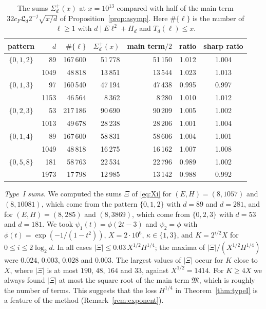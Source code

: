 \documentclass[11pt]{amsart}
\theoremstyle{remark}
\theoremstyle{definition}
\numberwithin{equation}{section}
\newcommand{\Lf}{\mathfrak{L}}
\begin{document}
\begin{table}[h]
\centering
\setlength{\tabcolsep}{6pt}
\begin{tabular}{crrrrcc}
\toprule
pattern & $d$ & $\#\{\ell\}$ & $\Sigma^+_d(x)$ & main term$/2$ & ratio & sharp ratio\\
\midrule
$\{0,1,2\}$ & 89 & 167\,600 & 51\,778 & 51\,150 & 1.012 & 1.004\\
 & 1049 & 48\,818 & 13\,851 & 13\,544 & 1.023 & 1.013\\
$\{0,1,3\}$ & 97 & 160\,540 & 47\,194 & 47\,438 & 0.995 & 0.997\\
 & 1153 & 46\,564 & 8\,362 & 8\,280 & 1.010 & 1.012\\
$\{0,2,3\}$ & 53 & 217\,186 & 90\,690 & 90\,209 & 1.005 & 1.002\\
 & 1013 & 49\,678 & 28\,238 & 28\,206 & 1.001 & 1.004\\
$\{0,1,4\}$ & 89 & 167\,600 & 58\,831 & 58\,606 & 1.004 & 1.001\\
 & 1049 & 48\,818 & 16\,275 & 16\,162 & 1.007 & 1.008\\
$\{0,5,8\}$ & 181 & 58\,763 & 22\,534 & 22\,796 & 0.989 & 1.002\\
 & 1973 & 17\,798 & 12\,985 & 13\,142 & 0.988 & 0.992\\
\bottomrule
\end{tabular}
\caption{The sums $\Sigma^+_d(x)$ at $x=10^{13}$ compared with half of the main term $32c_F\Lf_d2^{-j}\sqrt{x/d}$ of Proposition~\ref{prop:asymp}. Here $\#\{\ell\}$ is the number of $\ell\ge1$ with $d\mid E\ell^2+H_d$ and $T_d(\ell)\le x$.}
\label{tab:main}
\end{table}

\emph{Type~I sums.} We computed the sums $\Xi$ of \eqref{eq:Xi} for $(E,H)=(8,1057)$ and $(8,10081)$, which come from the pattern $\{0,1,2\}$ with $d=89$ and $d=281$, and for $(E,H)=(8,285)$ and $(8,3869)$, which come from $\{0,2,3\}$ with $d=53$ and $d=181$. We took $\psi_1(t)=\phi(2t-3)$ and $\psi_2=\phi$ with $\phi(t)=\exp(-1/(1-t^2))$, $X=2\cdot10^6$, $\kappa\in\{1,3\}$, and $K=2^{i/2}X$ for $0\le i\le2\log_2d$. In all cases $|\Xi|\le0.03\,X^{1/2}H^{1/4}$; the maxima of $|\Xi|/(X^{1/2}H^{1/4})$ were $0.024$, $0.003$, $0.028$ and $0.003$. The largest values of $|\Xi|$ occur for $K$ close to $X$, where $|\Xi|$ is at most $190$, $48$, $164$ and $33$, against $X^{1/2}=1414$. For $K\ge4X$ we always found $|\Xi|$ at most the square root of the main term $\mathfrak M$, which is roughly the number of terms. This suggests that the loss $H^{1/4}$ in Theorem~\ref{thm:typeI} is a feature of the method (Remark~\ref{rem:exponent}).
\end{document}

